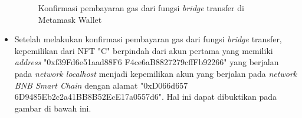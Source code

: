 \begin{itemize}
    \begin{figure} [H] \centering
      \caption{Konfirmasi pembayaran gas dari fungsi \emph{bridge} transfer di Metamask Wallet}
      \label{fig:bridge_transfer}
      \end{figure}
    
      \item Setelah melakukan konfirmasi pembayaran gas dari fungsi \emph{bridge} transfer, kepemilikan dari NFT "C" berpindah dari akun pertama yang memiliki \emph{address} "0xf39Fd6e51aad88F6
      F4ce6aB8827279cffFb92266" yang berjalan pada \emph{network localhost} menjadi kepemilikan akun yang berjalan pada \emph{network BNB Smart Chain} dengan alamat "0xD066d657
      6D9485Eb2c2a41BB8B52EcE17a0557d6". Hal ini dapat dibuktikan pada gambar di bawah ini.


\end{itemize}
